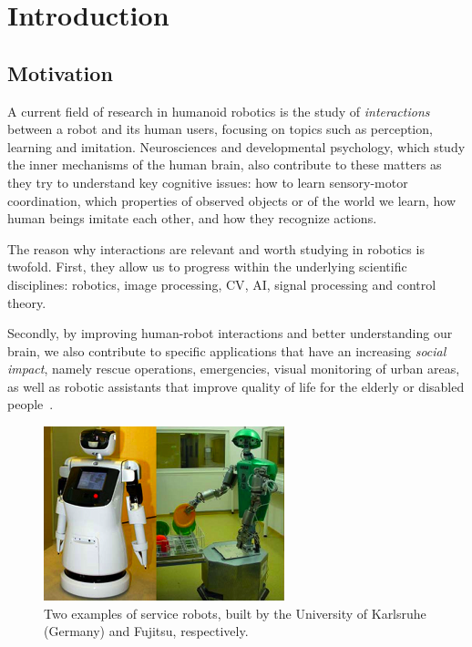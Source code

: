 

\chapter{Introduction}

\section{Motivation}

A current field of research in humanoid robotics is the study of \emph{interactions} between a robot and its human users, focusing on topics such as perception, learning and imitation. Neurosciences and developmental psychology, which study the inner mechanisms of the human brain, also contribute to these matters as they try to understand key cognitive issues: how to learn sensory-motor coordination, which properties of observed objects or of the world we learn, how human beings imitate each other, and how they recognize actions.

The reason why interactions are relevant and worth studying in robotics is twofold. First, they allow us to progress within the underlying scientific disciplines: robotics, image processing, \ac{CV}, \ac{AI}, signal processing and control theory.

Secondly, by improving human-robot interactions and better understanding our brain, we also contribute to specific applications that have an increasing \emph{social impact}, namely rescue operations, emergencies, visual monitoring of urban areas, as well as robotic assistants that improve quality of life for the elderly or disabled people~\cite{hu:2007}.

\begin{figure}
\centering
\includegraphics{figures/service_robots}
\caption[Example of service robots]{Two examples of service robots, built by the University of Karlsruhe (Germany) and Fujitsu, respectively.}
\label{img:service_robots}
\end{figure}

